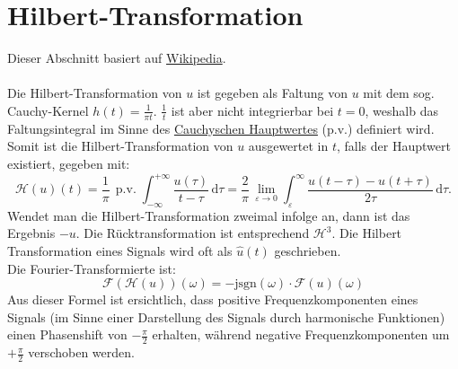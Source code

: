   \section{Hilbert-Transformation}\label{hiltrans}
  Dieser Abschnitt basiert auf \href{https://en.wikipedia.org/wiki/Hilbert_transform}{Wikipedia}.\\\\
  Die Hilbert-Transformation von $u$ ist gegeben als Faltung von $u$ mit dem sog. Cauchy-Kernel $h(t)=\frac{1}{\pi t}$. $\frac{1}{t}$ ist aber nicht integrierbar bei $t=0$, weshalb das Faltungsintegral im Sinne des \href{https://en.wikipedia.org/wiki/Cauchy_principal_value}{Cauchyschen Hauptwertes} (p.v.) definiert wird. Somit ist die Hilbert-Transformation von $u$ ausgewertet in $t$, falls der Hauptwert existiert, gegeben mit:
  \begin{equation}
  	 \mathcal{H}(u)(t) = \frac{1}{\pi}\, \operatorname{p.v.} \int_{-\infty}^{+\infty} \frac{u(\tau)}{t - \tau}\,\mathrm{d}\tau=\frac{2}{\pi}\, \lim_{\varepsilon \to 0} \int_\varepsilon^\infty \frac{u(t - \tau) - u(t + \tau)}{2\tau} \,\mathrm{d}\tau.
  \end{equation}
  Wendet man die Hilbert-Transformation zweimal infolge an, dann ist das Ergebnis $-u$. Die Rücktransformation ist entsprechend $\mathcal{H}^3$. Die Hilbert Transformation eines Signals wird oft als $\hat{u}(t)$ geschrieben.\\
  Die Fourier-Transformierte ist:
  \begin{equation}
  	\mathcal{F}\left(\mathcal{H}(u)\right)(\omega) = -\mathrm{j} \text{sgn}(\omega) \cdot \mathcal{F}(u)(\omega)
  \end{equation}
 Aus dieser Formel ist ersichtlich, dass positive Frequenzkomponenten eines Signals (im Sinne einer Darstellung des Signals durch harmonische Funktionen) einen Phasenshift von $-\frac{\pi}{2}$ erhalten, während negative Frequenzkomponenten um $+\frac{\pi}{2}$ verschoben werden.

